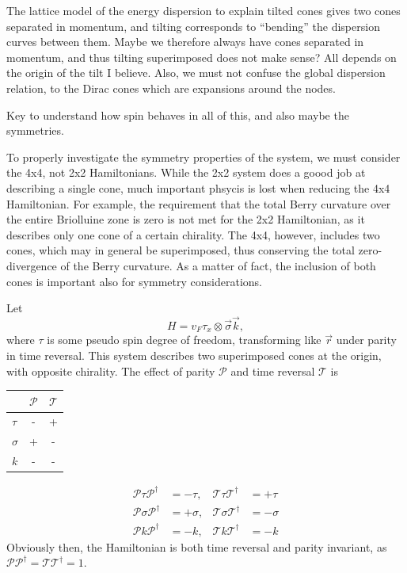 The lattice model of the energy dispersion to explain tilted cones gives two cones separated in momentum, and tilting corresponds to ``bending'' the dispersion curves between them.
Maybe we therefore always have cones separated in momentum, and thus tilting superimposed does not make sense?
All depends on the origin of the tilt I believe.
Also, we must not confuse the global dispersion relation, to the Dirac cones which are expansions around the nodes.

Key to understand how spin behaves in all of this, and also maybe the symmetries.

To properly investigate the symmetry properties of the system, we must consider the 4x4, not 2x2 Hamiltonians.
While the 2x2 system does a goood job at describing a single cone, much important phsycis is lost when reducing the 4x4 Hamiltonian.
For example, the requirement that the total Berry curvature over the entire Briolluine zone is zero is not met for the 2x2 Hamiltonian, as it describes only one cone of a certain chirality.
The 4x4, however, includes two cones, which may in general be superimposed, thus conserving the total zero-divergence of the Berry curvature.
As a matter of fact, the inclusion of both cones is important also for symmetry considerations.

Let
\[
  H = v_{F} \tau _{x} \otimes \vec{\sigma} \vec{k},
\]
where \(\tau \) is some pseudo spin degree of freedom, transforming like \(\vec{r}\) under parity in time reversal.
This system describes two superimposed cones at the origin, with opposite chirality.
The effect of parity \(\mathcal{P}\) and time reversal \(\mathcal{T}\) is
\begin{table}[h]
  \centering
  \begin{tabular}{lcc}
    & \(\mathcal{P}\) & \(\mathcal{T}\)\\
    \hline
    \(\tau \) & - & +\\
    \(\sigma \) & + & -\\
    \(k\) & - & -
  \end{tabular}
\end{table}
\begin{equation}
  \label{eq:26}
  \begin{aligned}
    \mathcal{P} \tau \mathcal{P}^{\dagger} &= -\tau, & \mathcal{T} \tau \mathcal{T}^{\dagger} &= +\tau\\
    \mathcal{P} \sigma  \mathcal{P}^{\dagger} &= + \sigma,  & \mathcal{T} \sigma  \mathcal{T}^{\dagger} &= -\sigma \\
    \mathcal{P} k \mathcal{P}^{\dagger} &= -k, & \mathcal{T} k \mathcal{T}^{\dagger} &= -k
  \end{aligned}
\end{equation}
Obviously then, the Hamiltonian is both time reversal and parity invariant, as \(\mathcal{P} \mathcal{P}^{\dagger} = \mathcal{T} \mathcal{T}^{\dagger} = 1\).

